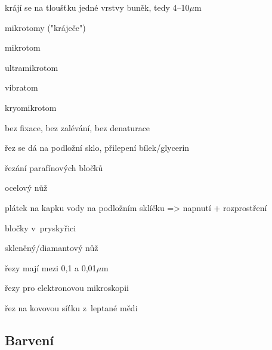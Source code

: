 \documentclass[DIV=8]{scrreprt}
\begin{document}
\begin{myItemize}[nosep]
    \item krájí se na tloušťku jedné vrstvy buněk, tedy 4--10\(\mu\)m
    \item mikrotomy ("kráječe")
\begin{myItemize}[nosep]
    \item mikrotom
    \item ultramikrotom
    \item vibratom
    \item kryomikrotom
\begin{myItemize}[nosep]
    \item bez fixace, bez zalévání, bez denaturace
\end{myItemize}

\end{myItemize}

    \item řez se dá na podložní sklo, přilepení bílek/glycerin
    \item řezání parafínových bločků
\begin{myItemize}[nosep]
    \item ocelový nůž
    \item plátek na kapku vody na podložním sklíčku => napnutí + rozprostření
\end{myItemize}

    \item bločky v pryskyřici
\begin{myItemize}[nosep]
    \item skleněný/diamantový nůž
    \item řezy mají mezi 0,1 a 0,01\(\mu\)m
\end{myItemize}

    \item řezy pro elektronovou mikroskopii
\begin{myItemize}[nosep]
    \item řez na kovovou síťku z leptané mědi
\end{myItemize}

\end{myItemize}



\subsection{Barvení} \label{Barvení}
\end{document}
